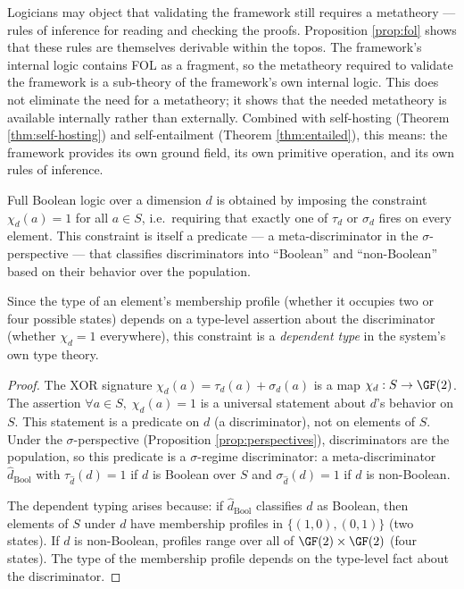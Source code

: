 \begin{remark}
Logicians may object that validating the framework still
requires a metatheory --- rules of inference for reading
and checking the proofs. Proposition \ref{prop:fol} shows
that these rules are themselves derivable within the topos.
The framework's internal logic contains FOL as a fragment,
so the metatheory required to validate the framework is
a sub-theory of the framework's own internal logic. This
does not eliminate the need for a metatheory; it shows
that the needed metatheory is available internally rather
than externally. Combined with self-hosting (Theorem
\ref{thm:self-hosting}) and self-entailment (Theorem
\ref{thm:entailed}), this means: the framework provides
its own ground field, its own primitive operation, and
its own rules of inference.
\end{remark}

\begin{proposition}
\label{prop:bool-dependent}
Full Boolean logic over a dimension $d$ is obtained by
imposing the constraint $\chi_d(a) = 1$ for all $a \in S$,
i.e.\ requiring that exactly one of $\tau_d$ or $\sigma_d$
fires on every element. This constraint is itself a
predicate --- a meta-discriminator in the $\sigma$-perspective
--- that classifies discriminators into ``Boolean'' and
``non-Boolean'' based on their behavior over the population.

Since the type of an element's membership profile
(whether it occupies two or four possible states) depends
on a type-level assertion about the discriminator (whether
$\chi_d = 1$ everywhere), this constraint is a
\emph{dependent type} in the system's own type theory.
\end{proposition}

\begin{proof}
The XOR signature $\chi_d(a) = \tau_d(a) + \sigma_d(a)$
is a map $\chi_d: S \to \GF(2)$. The assertion
$\forall a \in S,\; \chi_d(a) = 1$ is a universal
statement about $d$'s behavior on $S$. This statement is
a predicate on $d$ (a discriminator), not on elements of
$S$. Under the $\sigma$-perspective (Proposition
\ref{prop:perspectives}), discriminators are the population,
so this predicate is a $\sigma$-regime discriminator: a
meta-discriminator $\hat{d}_{\mathrm{Bool}}$ with
$\tau_{\hat{d}}(d) = 1$ if $d$ is Boolean over $S$ and
$\sigma_{\hat{d}}(d) = 1$ if $d$ is non-Boolean.

The dependent typing arises because: if
$\hat{d}_{\mathrm{Bool}}$ classifies $d$ as Boolean, then
elements of $S$ under $d$ have membership profiles in
$\{(1,0), (0,1)\}$ (two states). If $d$ is non-Boolean,
profiles range over all of $\GF(2) \times \GF(2)$ (four
states). The type of the membership profile depends on
the type-level fact about the discriminator.
\end{proof}

